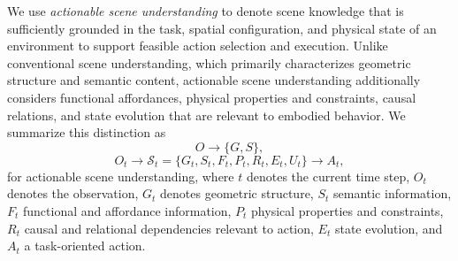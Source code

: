 \documentclass{SCIS2026}
\begin{document}
We use \emph{actionable scene understanding} to denote scene knowledge that is sufficiently grounded in the task, spatial configuration, and physical state of an environment to support feasible action selection and execution. Unlike conventional scene understanding, which primarily characterizes geometric structure and semantic content, actionable scene understanding additionally considers functional affordances, physical properties and constraints, causal relations, and state evolution that are relevant to embodied behavior. We summarize this distinction as
\begin{equation}
O \rightarrow \{G,S\},
\end{equation}
\begin{equation}
O_t \rightarrow
\mathcal{S}_t
=
\{G_t,S_t,F_t,P_t,R_t,E_t,U_t\}
\rightarrow
A_t,
\end{equation}
for actionable scene understanding, where $t$ denotes the current time step, $O_t$ denotes the observation, $G_t$ denotes geometric structure, $S_t$ semantic information, $F_t$ functional and affordance information, $P_t$ physical properties and constraints, $R_t$ causal and relational dependencies relevant to action, $E_t$ state evolution, and $A_t$ a task-oriented action.
\end{document}
